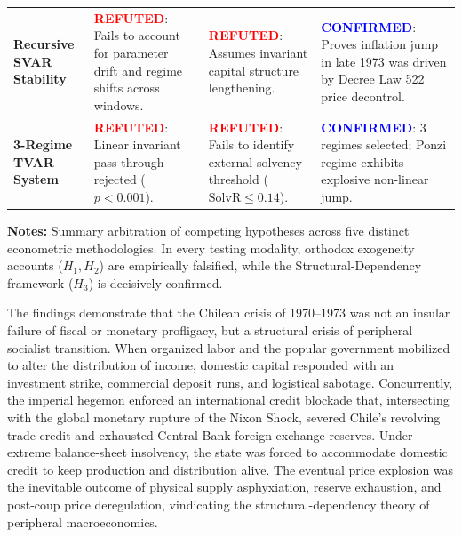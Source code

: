 \begin{table}[htbp]
\begin{tabularx}{\textwidth}{>{\raggedright\arraybackslash}p{3.0cm}>{\raggedright\arraybackslash}p{3.6cm}>{\raggedright\arraybackslash}p{3.6cm}>{\raggedright\arraybackslash}X}
\addlinespace[0.2em]
\textbf{Recursive SVAR Stability} & \textcolor{red}{\textbf{REFUTED}}: Fails to account for parameter drift and regime shifts across windows. & \textcolor{red}{\textbf{REFUTED}}: Assumes invariant capital structure lengthening. & \textcolor{blue}{\textbf{CONFIRMED}}: Proves inflation jump in late 1973 was driven by Decree Law 522 price decontrol. \\
\addlinespace[0.2em]
\textbf{3-Regime TVAR System} & \textcolor{red}{\textbf{REFUTED}}: Linear invariant pass-through rejected ($p < 0.001$). & \textcolor{red}{\textbf{REFUTED}}: Fails to identify external solvency threshold ($\text{SolvR} \le 0.14$). & \textcolor{blue}{\textbf{CONFIRMED}}: 3 regimes selected; Ponzi regime exhibits explosive non-linear jump. \\
\bottomrule
\end{tabularx}
\begin{minipage}{\textwidth}
\vspace{0.3em}
\footnotesize \textbf{Notes:} Summary arbitration of competing hypotheses across five distinct econometric methodologies. In every testing modality, orthodox exogeneity accounts ($H_1, H_2$) are empirically falsified, while the Structural-Dependency framework ($H_3$) is decisively confirmed.
\end{minipage}
\end{table}

The findings demonstrate that the Chilean crisis of 1970--1973 was not an insular failure of fiscal or monetary profligacy, but a structural crisis of peripheral socialist transition. When organized labor and the popular government mobilized to alter the distribution of income, domestic capital responded with an investment strike, commercial deposit runs, and logistical sabotage. Concurrently, the imperial hegemon enforced an international credit blockade that, intersecting with the global monetary rupture of the Nixon Shock, severed Chile's revolving trade credit and exhausted Central Bank foreign exchange reserves. Under extreme balance-sheet insolvency, the state was forced to accommodate domestic credit to keep production and distribution alive. The eventual price explosion was the inevitable outcome of physical supply asphyxiation, reserve exhaustion, and post-coup price deregulation, vindicating the structural-dependency theory of peripheral macroeconomics.
